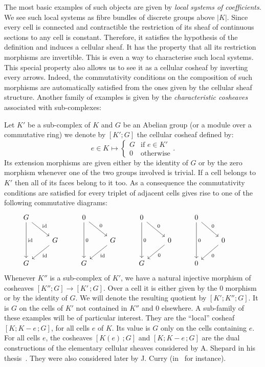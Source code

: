 \documentclass[AHL,Unicode,longabstracts,published]{cedram}
\DeclareMathOperator{\id}{id}
\begin{document}
The most basic examples of such objects are given by \emph{local systems of coefficients}. We see such local systems as fibre bundles of discrete groups above $|K|$. Since every cell is connected and contractible the restriction of its sheaf of continuous sections to any cell is constant. Therefore, it satisfies the hypothesis of the definition and induces a cellular sheaf. It has the property that all its restriction morphisms are invertible. This is even a way to characterise such local systems. This special property also allows us to see it as a cellular cosheaf by inverting every arrows. Indeed, the commutativity conditions on the composition of such morphisms are automatically satisfied from the ones given by the cellular sheaf structure. Another family of examples is given by the \emph{characteristic cosheaves} associated with sub-complexes:

\begin{defi}
Let $K'$ be a sub-complex of $K$ and $G$ be an Abelian group (or a module over a commutative ring) we denote by $[K';G]$ the cellular cosheaf defined by:
\begin{equation*}
e\in K \longmapsto \left\{
\begin{array}{cl} G & \text{if }e\in K' \\ 0 & \text{otherwise}
\end{array}\right..
\end{equation*}
Its extension morphisms are given either by the identity of $G$ or by the zero morphism whenever one of the two groups involved is trivial. If a cell belongs to $K'$ then all of its faces belong to it too. As a consequence the commutativity conditions are satisfied for every triplet of adjacent cells gives rise to one of the following commutative diagrams:
\begin{equation*}
\begin{tikzcd}
G \ar[dd,"\id"] \ar[dr,"\id"] & &  0 \ar[dd,"0"] \ar[dr,"0"] & &  0 \ar[dd,"0"] \ar[dr,"0"] & &  0 \ar[dd,"0"] \ar[dr,"0"] & & \\%
& G \ar[dl,"\id"] & &  G \ar[dl,"\id"] & &  0 \ar[dl,"0"] & &  0 \ar[dl,"0"] & \\%
G & &  G & &  G & &  0 & &
\end{tikzcd}
\end{equation*}
Whenever $K''$ is a sub-complex of $K'$, we have a natural injective morphism of cosheaves $[K'';G]\rightarrow [K'\,;G]$. Over a cell it is either given by the $0$ morphism or by the identity of $G$. We will denote the resulting quotient by $[K';K'';G]$. It is $G$ on the cells of $K'$ not contained in $K''$ and $0$ elsewhere. A sub-family of these examples will be of particular interest. They are the ``local'' cosheaf $[K;K-e\,;G]$, for all cells $e$ of $K$. Its value is $G$ only on the cells containing $e$. For all cells $e$, the cosheaves $[K(e)\,;G]$ and $[K;K-e\,;G]$ are the dual constructions of the elementary cellular sheaves considered by A. Shepard in his thesis~\cite{She_cel_des}. They were also considered later by J. Curry (in~\cite{Cur_she_cos} for instance).
\end{defi}
\end{document}
